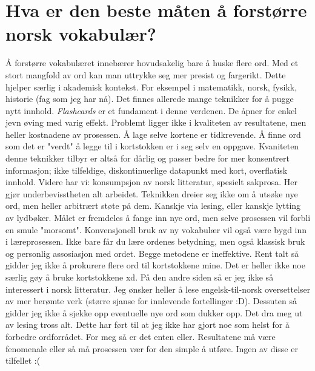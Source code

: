 \documentclass{article}
\numberwithin{equation}{section}
\begin{document}
\section{Hva er den beste måten å forstørre norsk vokabulær?}
Å forstørre vokabulæret innebærer hovudsakelig bare å huske flere ord. Med et stort mangfold av ord kan man uttrykke seg mer presist og fargerikt. Dette hjelper særlig i akademisk kontekst. For eksempel i matematikk, norsk, fysikk, historie (fag som jeg har nå). \newline
Det finnes allerede mange teknikker for å pugge nytt innhold. \textit{Flashcards} er et fundament i denne verdenen. De åpner for enkel jevn øving med varig effekt. Problemt ligger ikke i kvaliteten av resultatene, men heller kostnadene av prosessen. Å lage selve kortene er tidkrevende. Å finne ord som det er "verdt" å legge til i kortstokken er i seg selv en oppgave. Kvaniteten denne teknikker tilbyr er altså for dårlig og passer bedre for mer konsentrert informasjon; ikke tilfeldige, diskontinuerlige datapunkt med kort, overflatisk innhold. \newline
Videre har vi: konsumpsjon av norsk litteratur, spesielt sakprosa. Her gjør underbevisstheten alt arbeidet. Teknikken dreier seg ikke om å utsøke nye ord, men heller arbitrært støte på dem. Kanskje via lesing, eller kanskje lytting av lydbøker. Målet er fremdeles å fange inn nye ord, men selve prosessen vil forbli en smule "morsomt". Konvensjonell bruk av ny vokabulær vil også være bygd inn i læreprosessen. Ikke bare får du lære ordenes betydning, men også klassisk bruk og personlig assosiasjon med ordet. \newline 
Begge metodene er ineffektive. Rent talt så gidder jeg ikke å prokurere flere ord til kortstokkene mine. Det er heller ikke noe særlig gøy å bruke kortstokkene xd. På den andre siden så er jeg ikke så interessert i norsk litteratur. Jeg ønsker heller å lese engelsk-til-norsk oversettelser av mer berømte verk (større sjanse for innlevende fortellinger :D). Dessuten så gidder jeg ikke å sjekke opp eventuelle nye ord som dukker opp. Det dra meg ut av lesing tross alt. Dette har ført til at jeg ikke har gjort noe som helst for å forbedre ordforrådet. For meg så er det enten eller. Resultatene må være fenomenale eller så må prosessen vær for den simple å utføre. Ingen av disse er tilfellet :(
\end{document}
